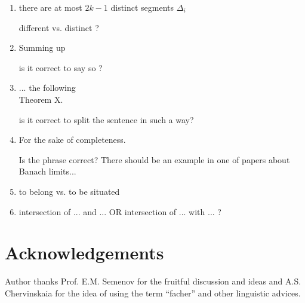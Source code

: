 \documentclass[a4paper,14pt]{article} %
\theoremstyle{plain}
\theoremstyle{definition}
\begin{document}
\begin{enumerate}
	\item
		there are at most $2k-1$ distinct segments $\Delta_i$

		different vs. distinct ?

	\item
		Summing up

		is it correct to say so ?

	\item
		... the following \\ Theorem X.

		is it correct to split the sentence in such a way?

	\item
		For the sake of completeness.

		Is the phrase correct?
		There should be an example in one of papers about Banach limits...

	\item
		to belong vs. to be situated

	\item
		intersection of ... and ...
		OR
		intersection of ... with ...
		?

\end{enumerate}

\section{Acknowledgements}
Author thanks Prof. E.M. Semenov for the fruitful discussion and ideas
and A.S. Chervinskaia for the idea of using the term ``facher'' and other linguistic advices.


\printbibliography
\end{document}
